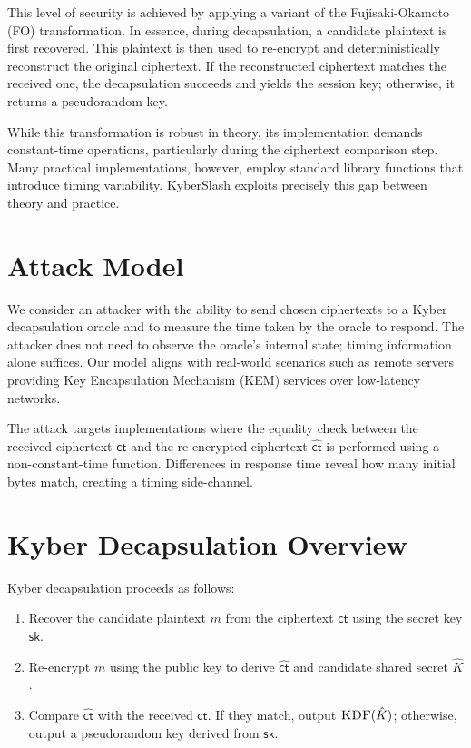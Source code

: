 \documentclass[11pt]{article}
\begin{document}
This level of security is achieved by applying a variant of the Fujisaki-Okamoto (FO) transformation. In essence, during decapsulation, a candidate plaintext is first recovered. This plaintext is then used to re-encrypt and deterministically reconstruct the original ciphertext. If the reconstructed ciphertext matches the received one, the decapsulation succeeds and yields the session key; otherwise, it returns a pseudorandom key.

While this transformation is robust in theory, its implementation demands constant-time operations, particularly during the ciphertext comparison step. Many practical implementations, however, employ standard library functions that introduce timing variability. KyberSlash exploits precisely this gap between theory and practice.

\section{Attack Model}
We consider an attacker with the ability to send chosen ciphertexts to a Kyber decapsulation oracle and to measure the time taken by the oracle to respond. The attacker does not need to observe the oracle's internal state; timing information alone suffices. Our model aligns with real-world scenarios such as remote servers providing Key Encapsulation Mechanism (KEM) services over low-latency networks.

The attack targets implementations where the equality check between the received ciphertext $\mathsf{ct}$ and the re-encrypted ciphertext $\hat{\mathsf{ct}}$ is performed using a non-constant-time function. Differences in response time reveal how many initial bytes match, creating a timing side-channel.

\section{Kyber Decapsulation Overview}
Kyber decapsulation proceeds as follows:
\begin{enumerate}
    \item Recover the candidate plaintext $m$ from the ciphertext $\mathsf{ct}$ using the secret key $\mathsf{sk}$.
    \item Re-encrypt $m$ using the public key to derive $\hat{\mathsf{ct}}$ and candidate shared secret $\hat{K}$.
    \item Compare $\hat{\mathsf{ct}}$ with the received $\mathsf{ct}$. If they match, output $\textsc{KDF}(\hat{K})$; otherwise, output a pseudorandom key derived from $\mathsf{sk}$.
\end{enumerate}
\end{document}
